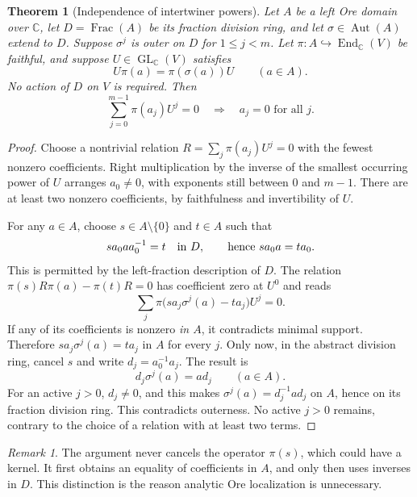\documentclass[11pt]{article}
\numberwithin{equation}{section}
\newtheorem{theorem}{Theorem}[section]
\theoremstyle{definition}
\theoremstyle{remark}
\newtheorem{remark}[remark]{Remark}
\newcommand{\C}{\mathbb C}
\newcommand{\Frac}{\operatorname{Frac}}
\newcommand{\End}{\operatorname{End}}
\newcommand{\Aut}{\operatorname{Aut}}
\begin{document}
\begin{theorem}[Independence of intertwiner powers]\label{thm:oreind}
Let $A$ be a left Ore domain over $\C$, let $D=\Frac(A)$ be its fraction
division ring, and let $\sigma\in\Aut(A)$ extend to $D$. Suppose
$\sigma^j$ is outer on $D$ for $1\leq j<m$.
Let $\pi:A\hookrightarrow\End_\C(V)$ be faithful, and suppose
$U\in\operatorname{GL}_\C(V)$ satisfies
\begin{equation}\label{eq:covgeneral}
 U\pi(a)=\pi(\sigma(a))U\qquad(a\in A).
\end{equation}
No action of $D$ on $V$ is required. Then
\begin{equation}\label{eq:oreind}
 \sum_{j=0}^{m-1}\pi(a_j)U^j=0\quad\Longrightarrow\quad a_j=0\text{ for all }j.
\end{equation}
\end{theorem}
\begin{proof}
Choose a nontrivial relation $R=\sum_j\pi(a_j)U^j=0$ with the fewest nonzero
coefficients. Right multiplication by the inverse of the smallest occurring
power of $U$ arranges $a_0\ne0$, with exponents still between $0$ and $m-1$.
There are at least two nonzero coefficients, by faithfulness and invertibility
of $U$.

For any $a\in A$, choose $s\in A\setminus\{0\}$ and $t\in A$ such that
\[
 s a_0aa_0^{-1}=t\quad\hbox{in }D,
 \qquad\hbox{hence }s a_0a=t a_0.
\]
This is permitted by the left-fraction description of $D$. The relation
$\pi(s)R\pi(a)-\pi(t)R=0$ has coefficient zero at $U^0$ and reads
\[
 \sum_j\pi\bigl(s a_j\sigma^j(a)-t a_j\bigr)U^j=0.
\]
If any of its coefficients is nonzero \emph{in $A$}, it contradicts minimal
support. Therefore $s a_j\sigma^j(a)=t a_j$ in $A$ for every $j$.
Only now, in the abstract division ring, cancel $s$ and write
$d_j=a_0^{-1}a_j$. The result is
\[
 d_j\sigma^j(a)=a d_j\qquad(a\in A).
\]
For an active $j>0$, $d_j\ne0$, and this makes
$\sigma^j(a)=d_j^{-1}ad_j$ on $A$, hence on its fraction division ring.
This contradicts outerness. No active $j>0$ remains, contrary to the choice
of a relation with at least two terms.
\end{proof}

\begin{remark}
The argument never cancels the operator $\pi(s)$, which could have a kernel.
It first obtains an equality of coefficients in $A$, and only then uses
inverses in $D$. This distinction is the reason analytic Ore localization is
unnecessary.
\end{remark}
\end{document}
